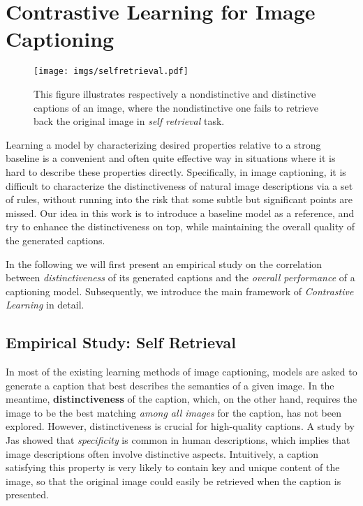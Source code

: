 
\section{Contrastive Learning for Image Captioning}
\label{sec:frmwork}

\begin{figure}
	\centering
	\texttt{[image: imgs/selfretrieval.pdf]}
	\caption{\small This figure illustrates respectively a nondistinctive and distinctive captions of an image,
                 where the nondistinctive one fails to retrieve back the original image in \emph{self retrieval} task.}
	\label{fig:selfretrieval}
	\vspace{-1mm}
\end{figure}



Learning a model by characterizing desired properties relative to a strong baseline
is a convenient and often quite effective way in situations
where it is hard to describe these properties directly.
Specifically, in image captioning,
it is difficult to characterize
the distinctiveness of natural image descriptions
via a set of rules,
without running into the risk that some subtle but significant points are missed.
Our idea in this work is to introduce a baseline model as a reference,
and try to enhance the distinctiveness on top, while maintaining the
overall quality of the generated captions.

In the following we will first present an empirical study
on the correlation between \emph{distinctiveness} of its generated captions and the
\emph{overall performance} of a captioning model.
Subsequently, we introduce the main framework of \emph{Contrastive Learning}
in detail.

\subsection{Empirical Study: Self Retrieval}
\label{sec:selfretrieval}

In most of the existing learning methods of image captioning,
models are asked to generate a caption that best describes the semantics of a given image.
In the meantime, \textbf{distinctiveness} of the caption,
which, on the other hand, requires the image to be the best matching \emph{among all images}
for the caption, has not been explored.
However, distinctiveness is crucial for high-quality captions.
A study by Jas \cite{jas2015image} showed that \emph{specificity} is common in human descriptions, 
which implies that image descriptions often involve distinctive aspects.
Intuitively, a caption satisfying this property is very likely to contain key and unique content of the image,
so that the original image could easily be retrieved when the caption is presented.

